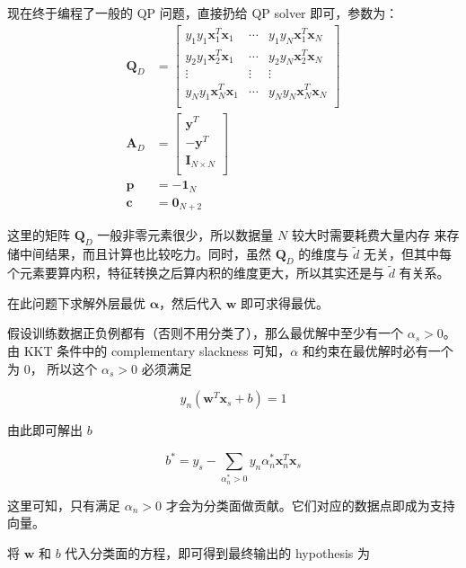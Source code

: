 \documentclass[a4paper]{article}
\begin{document}
现在终于编程了一般的 QP 问题，直接扔给 QP solver 即可，参数为：
\begin{equation}
\begin{aligned}
\mathbf{Q}_D &=
    \begin{bmatrix}
        y_1y_1\mathbf{x}_1^{T}\mathbf{x}_1 & \cdots & y_1y_N\mathbf{x}_1^{T}\mathbf{x}_N \\
        y_2y_1\mathbf{x}_2^{T}\mathbf{x}_1 & \cdots & y_2y_N\mathbf{x}_2^{T}\mathbf{x}_N \\
        \vdots & \vdots & \vdots \\
        y_Ny_1\mathbf{x}_N^{T}\mathbf{x}_1 & \cdots & y_Ny_N\mathbf{x}_N^{T}\mathbf{x}_N \\
    \end{bmatrix} \\
\mathbf{A}_D &=
    \begin{bmatrix}
        \mathbf{y}^{T} \\
        -\mathbf{y}^{T} \\
        \mathbf{I}_{N \times N} \\
    \end{bmatrix} \\
\mathbf{p} &= -\mathbf{1}_{N} \\
\mathbf{c} &= \mathbf{0}_{N+2}
\end{aligned}
\end{equation}

这里的矩阵 $\mathbf{Q}_D$ 一般非零元素很少，所以数据量 $N$ 较大时需要耗费大量内存
来存储中间结果，而且计算也比较吃力。同时，虽然 $\mathbf{Q}_D$ 的维度与 $\tilde{d}$
无关，但其中每个元素要算内积，特征转换之后算内积的维度更大，所以其实还是与 $\tilde{d}$
有关系。

在此问题下求解外层最优 $\mathbf{\alpha}$，然后代入 $\mathbf{w}$ 即可求得最优。

假设训练数据正负例都有（否则不用分类了），那么最优解中至少有一个 $\alpha_s > 0$。
由 KKT 条件中的 complementary slackness 可知，$\alpha$ 和约束在最优解时必有一个为 0，
所以这个 $\alpha_s > 0$ 必须满足

$$y_n(\mathbf{w}^{T}\mathbf{x}_s + b) = 1$$

由此即可解出 $b$

$$b^{*} = y_s - \sum_{\alpha_n^{*} > 0} y_n\alpha_n^{*} \mathbf{x}_n^{T} \mathbf{x}_s$$

这里可知，只有满足 $\alpha_n > 0$ 才会为分类面做贡献。它们对应的数据点即成为支持向量。

将 $\mathbf{w}$ 和 $b$ 代入分类面的方程，即可得到最终输出的 hypothesis 为
\end{document}
